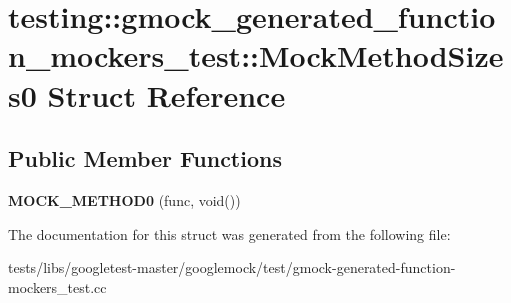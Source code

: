 \hypertarget{structtesting_1_1gmock__generated__function__mockers__test_1_1MockMethodSizes0}{}\section{testing\+:\+:gmock\+\_\+generated\+\_\+function\+\_\+mockers\+\_\+test\+:\+:Mock\+Method\+Sizes0 Struct Reference}
\label{structtesting_1_1gmock__generated__function__mockers__test_1_1MockMethodSizes0}
\subsection*{Public Member Functions}
\begin{DoxyCompactItemize}
\item 
\mbox{\label{structtesting_1_1gmock__generated__function__mockers__test_1_1MockMethodSizes0_ad72a29f7a84b94e60a6697952d086ec9}} 
{\bfseries M\+O\+C\+K\+\_\+\+M\+E\+T\+H\+O\+D0} (func, void())
\end{DoxyCompactItemize}


The documentation for this struct was generated from the following file\+:\begin{DoxyCompactItemize}
\item 
tests/libs/googletest-\/master/googlemock/test/gmock-\/generated-\/function-\/mockers\+\_\+test.\+cc\end{DoxyCompactItemize}
